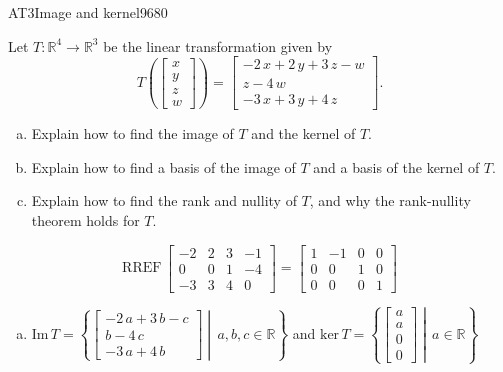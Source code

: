 \begin{exercise}{AT3}{Image and kernel}{9680} 
\begin{exerciseStatement} 

 Let \(T:\mathbb{R}^4 \to \mathbb{R}^3\) be the linear transformation given by \[T\left( \left[\begin{array}{c}
x \\
y \\
z \\
{w}
\end{array}\right] \right) = \left[\begin{array}{c}
-2 \, x + 2 \, y + 3 \, z - {w} \\
z - 4 \, {w} \\
-3 \, x + 3 \, y + 4 \, z
\end{array}\right].\] 

 

\begin{enumerate}[(a)]
\item Explain how to find the image of \(T\) and the kernel of \(T\).
\item Explain how to find a basis of the image of \(T\) and a basis of the kernel of \(T\).
\item Explain how to find the rank and nullity of \(T\), and why the rank-nullity theorem holds for \(T\).
\end{enumerate}

     \end{exerciseStatement}
 \begin{exerciseAnswer} 

\[\mathrm{RREF}\,\left[\begin{array}{cccc}
-2 & 2 & 3 & -1 \\
0 & 0 & 1 & -4 \\
-3 & 3 & 4 & 0
\end{array}\right]=\left[\begin{array}{cccc}
1 & -1 & 0 & 0 \\
0 & 0 & 1 & 0 \\
0 & 0 & 0 & 1
\end{array}\right]\]

 

\begin{enumerate}[(a)]
\item  

 \(\mathrm{Im}\,T =  \left\{ \left[\begin{array}{c}
-2 \, a + 3 \, b - c \\
b - 4 \, c \\
-3 \, a + 4 \, b
\end{array}\right] \middle|\,a,b,c\in\mathbb{R}\right\}\) and \(\mathrm{ker}\,T = \left\{ \left[\begin{array}{c}
a \\
a \\
0 \\
0
\end{array}\right] \middle|\,a\in\mathbb{R}\right\}\) 


\end{enumerate}
\end{exerciseAnswer}
\end{exercise}
